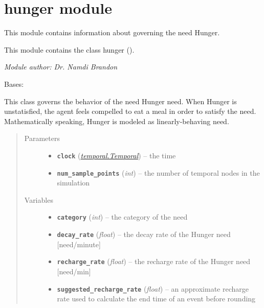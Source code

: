 \documentclass[letterpaper,10pt,english]{sphinxmanual}
\begin{document}
\section{hunger module}
\label{hunger::doc}\label{hunger:module-hunger}\label{hunger:hunger-module}
This module contains information about governing the need Hunger.

This module contains the class hunger ({\hyperref[hunger:hunger.Hunger]{\emph{}}}).

\emph{Module author: Dr. Namdi Brandon}

\begin{fulllineitems}
\label{hunger:hunger.Hunger}
Bases: {\hyperref[need:need.Need]{\emph{}}}

This class governs the behavior of the need Hunger need. When Hunger is unstatisfied,
the agent feels compelled to eat a meal in order to satisfy the need. Mathematically     speaking, Hunger is modeled as linearly-behaving need.
\begin{quote}\begin{description}
\item[{Parameters}] \leavevmode\begin{itemize}
\item {} 
\textbf{\texttt{clock}} ({\hyperref[temporal:temporal.Temporal]{\emph{\emph{temporal.Temporal}}}}) -- the time

\item {} 
\textbf{\texttt{num\_sample\_points}} (\emph{int}) -- the number of temporal nodes in the simulation

\end{itemize}

\item[{Variables}] \leavevmode\begin{itemize}
\item {} 
\textbf{\texttt{category}} (\emph{int}) -- the category of the need

\item {} 
\textbf{\texttt{decay\_rate}} (\emph{float}) -- the decay rate of the Hunger need {[}need/minute{]}

\item {} 
\textbf{\texttt{recharge\_rate}} (\emph{float}) -- the recharge rate of the Hunger need {[}need/min{]}

\item {} 
\textbf{\texttt{suggested\_recharge\_rate}} (\emph{float}) -- an approximate recharge rate used to calculate the end time of an     event before rounding


\end{itemize}
\end{description}
\end{quote}
\end{fulllineitems}
\end{document}
